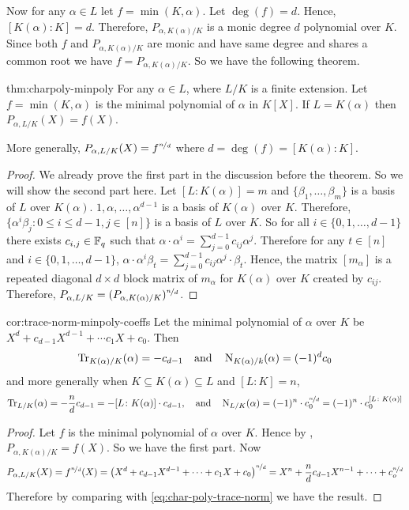 Now for any $\alpha\in L$ let $f=\min(K,\alpha)$. Let $\deg(f)=d$. Hence, $[K(\alpha)\colon K]=d$. Therefore, $P_{\alpha,K(\alpha)/K}$ is a monic degree $d$ polynomial over $K$. Since both $f$ and $P_{\alpha,K(\alpha)/K}$ are monic and have same degree and shares a common root we have $f=P_{\alpha,K(\alpha)/K}$. So we have the following theorem.
\begin{Theorem}{}{thm:charpoly-minpoly}
  For any $\alpha\in L$, where $L/K$ is a finite extension.
  Let $f=\min(K,\alpha)$ is the minimal polynomial of $\alpha$ in $K[X]$. If $L=K(\alpha)$ then $P_{\alpha,L/K}(X)=f(X)$.

  More generally, $P_{\alpha,L/K}(X)=f^{\nicefrac{n}d}$ where $d=\deg(f)=[K(\alpha)\colon K]$.
\end{Theorem}
\begin{proof}
  We already prove the first part in the discussion before the theorem. So we will show the second part here. Let $[L\colon K(\alpha)]=m$ and $\{\beta_1,\dots,\beta_m\}$ is a basis of $L$ over $K(\alpha)$. $1,\alpha,\dots,\alpha^{d-1}$ is a basis of $K(\alpha)$ over $K$. Therefore, $\{\alpha^i\beta_j\colon 0\leq i\leq d-1,j\in[n]\}$ is a basis of $L$ over $K$.
  So for all $i\in\{0,1,\dots,d-1\}$ there exists $c_{i,j}\in \mathbb{F}_q$ such that $\alpha\cdot \alpha^i=\sum_{j=0}^{d-1}c_{ij}\alpha^j$. Therefore for any $t\in[n]$ and $i\in\{0,1,\dots, d-1\}$, $\alpha\cdot \alpha^i\beta_t=\sum_{j=0}^{d-1}c_{ij}\alpha^j\cdot \beta_t$. Hence, the matrix  $[m_{\alpha}]$ is a repeated diagonal $d\times d$ block matrix of $m_{\alpha}$ for $K(\alpha)$ over $K$ created by $c_{ij}$. Therefore, $P_{\alpha,L/K}=(P_{\alpha,K(\alpha)/K})^{\nicefrac{n}d}$.
\end{proof}

\begin{corolary}{}{cor:trace-norm-minpoly-coeffs}
  Let the minimal polynomial of $\alpha$ over $K$ be $X^d+c_{d-1}X^{d-1}+\cdots c_1X+c_0$. Then $$\operatorname{Tr}_{K(\alpha)/K}(\alpha)=-c_{d-1}\quad\text{and}\quad
    \operatorname{N}_{K(\alpha)/k}(\alpha)=(-1)^dc_0$$and more generally when $K\subseteq K(\alpha)\subseteq L$ and $[L\colon K]=n$, $$\operatorname{Tr}_{L/K}(\alpha)=-\frac{n}dc_{d-1}=-[L\colon K(\alpha)]\cdot c_{d-1},\quad \text{and}\quad
    \operatorname{N}_{L/K}(\alpha)=(-1)^n\cdot c_0^{\nicefrac{n}d}=(-1)^n\cdot c_0^{[L\colon K(\alpha)]}$$
\end{corolary}
\begin{proof}
  Let $f$ is the minimal polynomial of $\alpha$ over $K$. Hence by \CharPolyMinPolythm, $P_{\alpha,K(\alpha)/K}=f(X)$. So we have the first part. Now $$P_{\alpha,L/K}(X)=f^{\nicefrac{n}d}(X)=\left(X^d+c_{d-1}X^{d-1}+\cdots +c_1X+c_0\right)^{\nicefrac{n}d}=X^n+\frac{n}dc_{d-1}X^{n-1}+\cdots +c_o^{\nicefrac{n}d}$$Therefore by comparing with \eqref{eq:char-poly-trace-norm} we have the result.
\end{proof}

